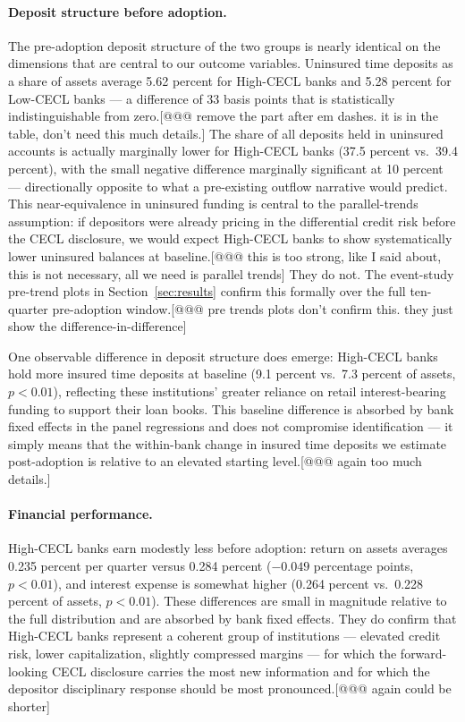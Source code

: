 \paragraph{Deposit structure before adoption.}
The pre-adoption deposit structure of the two groups is nearly identical on the
dimensions that are central to our outcome variables.  Uninsured time deposits
as a share of assets average 5.62 percent for High-CECL banks and 5.28 percent
for Low-CECL banks --- a difference of 33 basis points that is statistically
indistinguishable from zero.[@@@ remove the part after em dashes. it is in the table, don't need this much details.]  The share of all deposits held in uninsured
accounts is actually marginally lower for High-CECL banks (37.5 percent vs.\
39.4 percent), with the small negative difference marginally significant at
10 percent --- directionally opposite to what a pre-existing outflow narrative
would predict.  This near-equivalence in uninsured funding is central to the
parallel-trends assumption: if depositors were already pricing in the
differential credit risk before the CECL disclosure, we would expect High-CECL
banks to show systematically lower uninsured balances at baseline.[@@@ this is too strong, like I said about, this is not necessary, all we need is parallel trends]  They do
not.  The event-study pre-trend plots in Section~\ref{sec:results} confirm this
formally over the full ten-quarter pre-adoption window.[@@@ pre trends plots don't confirm this. they just show the difference-in-difference]

One observable difference in deposit structure does emerge: High-CECL banks hold
more insured time deposits at baseline (9.1 percent vs.\ 7.3 percent of assets,
$p < 0.01$), reflecting these institutions' greater reliance on retail
interest-bearing funding to support their loan books.  This baseline difference
is absorbed by bank fixed effects in the panel regressions and does not
compromise identification --- it simply means that the within-bank change in
insured time deposits we estimate post-adoption is relative to an elevated
starting level.[@@@ again too much details.]

\paragraph{Financial performance.}
High-CECL banks earn modestly less before adoption: return on assets averages
0.235 percent per quarter versus 0.284 percent ($-0.049$ percentage points,
$p < 0.01$), and interest expense is somewhat higher (0.264 percent vs.\
0.228 percent of assets, $p < 0.01$).  These differences are small in magnitude
relative to the full distribution and are absorbed by bank fixed effects.
They do confirm that High-CECL banks represent a coherent group of institutions
--- elevated credit risk, lower capitalization, slightly compressed margins ---
for which the forward-looking CECL disclosure carries the most new information
and for which the depositor disciplinary response should be most pronounced.[@@@ again could be shorter]

